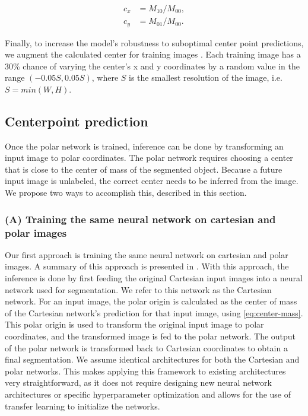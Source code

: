   \begin{equation}
    \begin{aligned}
      c_x &= M_{10} / M_{00}, \\
      c_y &= M_{01} / M_{00}.
    \end{aligned}
    \label{eq:center-mass}
  \end{equation}

Finally, to increase the model's robustness to suboptimal center point predictions, we augment the 
calculated center for training images \cite{estevesPolarTransformerNetworks2018a}. Each training image has 
a 30\% chance of varying the center's x and y coordinates by a random value in the range $(-0.05S, 
0.05S)$, where $S$ is the smallest resolution of the image, i.e. $S = min(W, H)$.
 
    \subsection{Centerpoint prediction}
    
Once the polar network is trained, inference can be done by transforming an input image to polar 
coordinates. The polar network requires choosing a center that is close to the center of mass of the 
segmented object. Because a future input image is unlabeled, the correct center needs to be inferred from 
the image. We propose two ways to accomplish this, described in this section.

   \subsubsection{(A) Training the same neural network on cartesian and polar images}
   \label{retraining-approach}
   
Our first approach is training the same neural network on cartesian and polar images. A summary of this
approach is presented in . With this approach, 
the inference is done by first feeding the original Cartesian input images into a neural 
network used for segmentation. We refer to this network as the Cartesian network.
For an input image, the polar origin is calculated as the center of mass of the Cartesian network's
prediction for that input image, using \eqref{eq:center-mass}.
This polar origin is used to transform the original input image to polar coordinates, and the transformed 
image is fed
to the polar network. The output of the polar network is transformed back to Cartesian coordinates
to obtain a final segmentation. We assume 
identical architectures for both the Cartesian and polar networks. This makes applying this
framework to existing architectures very straightforward, as it does not require designing new neural 
network architectures or specific hyperparameter optimization and allows for the use of transfer learning to
initialize the networks.


